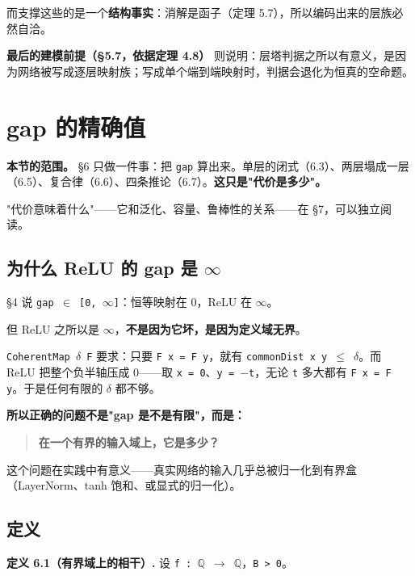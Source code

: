 \documentclass[11pt,a4paper]{ctexart}
\begin{document}
而支撑这些的是一个\textbf{结构事实}：消解是函子（定理 5.7），所以编码出来的层族必然自洽。

\textbf{最后的建模前提（§5.7，依据定理 4.8）} 则说明：层塔判据之所以有意义，是因为网络被写成逐层映射族；写成单个端到端映射时，判据会退化为恒真的空命题。

\bigskip

\section{gap 的精确值}

\textbf{本节的范围。} §6 只做一件事：把 \texttt{gap} 算出来。单层的闭式（6.3）、两层塌成一层（6.5）、复合律（6.6）、四条推论（6.7）。\textbf{这只是"代价是多少"。}

"代价意味着什么"——它和泛化、容量、鲁棒性的关系——在 §7，可以独立阅读。

\subsection{为什么 ReLU 的 gap 是 \ensuremath{\infty}}

§4 说 \texttt{gap \ensuremath{\in} [0, \ensuremath{\infty}]}：恒等映射在 0，ReLU 在 \ensuremath{\infty}。

但 ReLU 之所以是 \ensuremath{\infty}，\textbf{不是因为它坏，是因为定义域无界}。

\texttt{CoherentMap \ensuremath{\delta} F} 要求：只要 \texttt{F x = F y}，就有 \texttt{commonDist x y \ensuremath{\le} \ensuremath{\delta}}。而 ReLU 把整个负半轴压成 0——取 \texttt{x = 0}、\texttt{y = \ensuremath{-}t}，无论 \texttt{t} 多大都有 \texttt{F x = F y}。于是任何有限的 \texttt{\ensuremath{\delta}} 都不够。

\textbf{所以正确的问题不是"gap 是不是有限"，而是：}

\begin{quote}
\textbf{在一个有界的输入域上，它是多少？}
\end{quote}

这个问题在实践中有意义——真实网络的输入几乎总被归一化到有界盒（LayerNorm、tanh 饱和、或显式的归一化）。

\subsection{定义}

\textbf{定义 6.1（有界域上的相干）.} 设 \texttt{f : \ensuremath{\mathbb{Q}} \ensuremath{\to} \ensuremath{\mathbb{Q}}}，\texttt{B > 0}。
\end{document}
